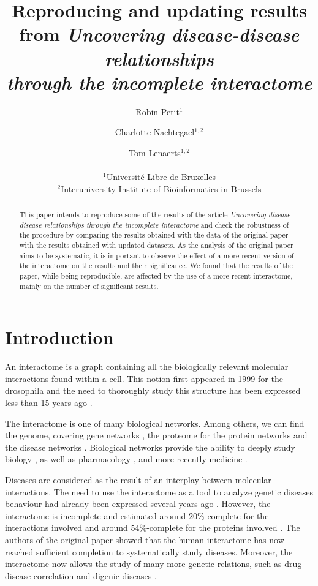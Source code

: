 \documentclass[letterpaper]{article}
\title{Reproducing and updating results from
\textit{Uncovering disease-disease relationships\\through the incomplete interactome}}
\author{Robin Petit$^{1}$ \and Charlotte Nachtegael$^{1,2}$ \and Tom Lenaerts$^{1,2}$\\
\mbox{}\\
$^1$Université Libre de Bruxelles\\
$^2$Interuniversity Institute of Bioinformatics in Brussels}
\begin{document}
\maketitle

\begin{abstract}
This paper intends to reproduce some of the results of the article \textit{Uncovering
disease-disease relationships through the incomplete interactome} \citep{originalPaper}
and check the robustness of the procedure by comparing the results obtained with the data
of the original paper with the results obtained with updated datasets. As the analysis of
the original paper aims to be systematic, it is important to observe the effect of a
more recent version of the interactome on the results and their significance. We found that
the results of the paper, while being reproducible, are affected by the use of a more recent
interactome, mainly on the number of significant results.
\end{abstract}

\section{Introduction}
An interactome is a graph containing all the biologically relevant molecular interactions found within
a cell. This notion first appeared in 1999 for the drosophila \citep{sanchez1999grasping} and the need
to thoroughly study this structure has been expressed less than 15 years ago
\citep{UnderstandingTheCellFunctionalOrganization}.

The interactome is one of many biological networks. Among others, we can find the genome, covering
gene networks \citep{boucher2013genetic}, the proteome for the protein networks
\citep{rolland2014proteome} and the disease networks \citep{goh2007human}. Biological networks provide
the ability to deeply study biology \citep{UnderstandingTheCellFunctionalOrganization}, as well as
pharmacology \citep{hopkins2008network}, and more recently medicine \citep{barabasi2011network}.

Diseases are considered as the result of an interplay between molecular interactions. The need to use
the interactome as a tool to analyze genetic diseases behaviour had already been expressed several years
ago \citep{vidal2011interactome}. However, the interactome is incomplete and estimated around $20\%$-complete
for the interactions involved and around $54\%$-complete for the proteins involved
\citep{ATruerMeasureOfOurIgnorance,estimatingTheSizeOfTheHumanInteractome}. The authors of the original paper
\citep{originalPaper} showed that the human interactome has now reached sufficient completion to systematically
study diseases. Moreover, the interactome now allows the study of many more genetic relations, such as
drug-disease correlation \citep{Yu2016extraction} and digenic diseases \citep{gazzo2015dida}.
\end{document}
